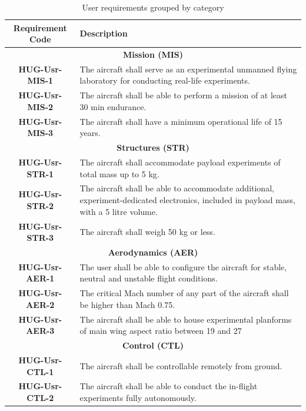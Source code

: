 \begin{table}[H]
    \centering
    \caption{User requirements grouped by category}
    \begin{tabular}{|c|p{13cm}|}
        \hline 
        \textbf{Requirement Code} & \textbf{Description} \\
        \hline \hline
        \multicolumn{2}{|c|}{\textbf{Mission (MIS)}} \\
        \hline
        \textbf{HUG-Usr-MIS-1} & The aircraft shall serve as an experimental unmanned flying laboratory for conducting real-life experiments.\\
        \hline
        \textbf{HUG-Usr-MIS-2} & The aircraft shall be able to perform a mission of at least 30 min endurance.\\
        \hline
        \textbf{HUG-Usr-MIS-3} & The aircraft shall have a minimum operational life of 15 years.\\
        \hline

        \multicolumn{2}{|c|}{\textbf{Structures (STR)}} \\
        \hline
        \textbf{HUG-Usr-STR-1} & The aircraft shall accommodate payload experiments of total mass up to 5 kg.\\
        \hline
        \textbf{HUG-Usr-STR-2} & The aircraft shall be able to accommodate additional, experiment-dedicated electronics, included in payload mass, with a 5 litre volume.\\
        \hline
        \textbf{HUG-Usr-STR-3} & The aircraft shall weigh 50 kg or less.\\
        \hline

        \multicolumn{2}{|c|}{\textbf{Aerodynamics (AER)}} \\
        \hline
        \textbf{HUG-Usr-AER-1} & The user shall be able to configure the aircraft for stable, neutral and unstable flight conditions. \\ 
        \hline
        \textbf{HUG-Usr-AER-2} & The critical Mach number of any part of the aircraft shall be higher than Mach 0.75.\\ \hline
        \textbf{HUG-Usr-AER-3} & The aircraft shall be able to house experimental planforms of main wing aspect ratio between 19 and 27 \cite{Aerodynamic_Analysis}\\
        \hline

        \multicolumn{2}{|c|}{\textbf{Control (CTL)}} \\
        \hline
        \textbf{HUG-Usr-CTL-1} & The aircraft shall be controllable remotely from ground.\\ \hline
        \textbf{HUG-Usr-CTL-2} & The aircraft shall be able to conduct the in-flight experiments fully autonomously.\\
        \hline


\end{tabular}
\end{table}
